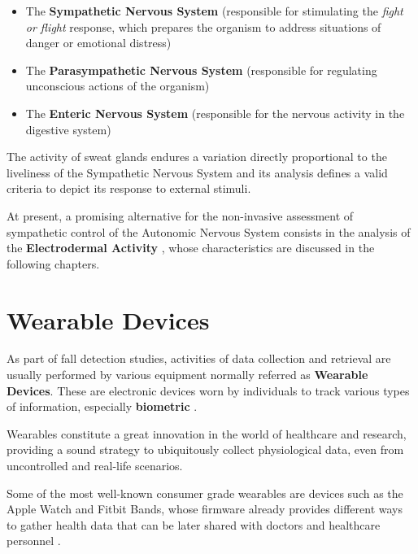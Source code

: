 \begin{itemize}
    \item The \textbf{Sympathetic Nervous System} (responsible for stimulating the \textit{fight or flight} response, which prepares the organism to address situations of danger or emotional distress)
    \item The \textbf{Parasympathetic Nervous System} (responsible for regulating unconscious actions of the organism)
    \item The \textbf{Enteric Nervous System} (responsible for the nervous activity in the digestive system)
\end{itemize}

The activity of sweat glands endures a variation directly proportional to the liveliness of the Sympathetic Nervous System and its analysis defines a valid criteria to depict its response to external stimuli.

At present, a promising alternative for the non-invasive assessment of sympathetic control of the Autonomic Nervous System consists in the analysis of the \textbf{Electrodermal Activity} \cite{edaIntro1}, whose characteristics are discussed in the following chapters.

\section{Wearable Devices}\label{sec:wearables}


As part of fall detection studies, activities of data collection and retrieval are usually performed by various equipment normally referred as \textbf{Wearable Devices}. These are electronic devices worn by individuals to track various types of information, especially \textbf{biometric} \cite{wearablesDefinition}.

Wearables constitute a great innovation in the world of healthcare and research, providing a sound strategy to ubiquitously collect physiological data, even from uncontrolled and real-life scenarios.

Some of the most well-known consumer grade wearables are devices such as the Apple Watch and Fitbit Bands, whose firmware already provides different ways to gather health data that can be later shared with doctors and healthcare personnel \cite{wearablesBest}. 

